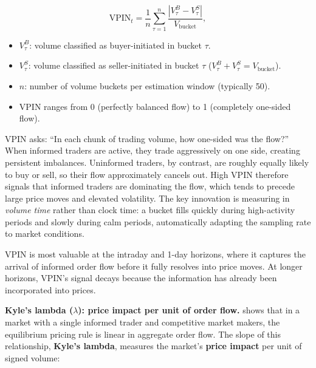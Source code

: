 \begin{equation}\label{eq:vpin}
\text{VPIN}_t = \frac{1}{n} \sum_{\tau=1}^{n} \frac{|V_\tau^B - V_\tau^S|}{V_{\text{bucket}}},
\end{equation}
\begin{itemize}[nosep]
  \item $V_\tau^B$: volume classified as buyer-initiated in bucket $\tau$.
  \item $V_\tau^S$: volume classified as seller-initiated in bucket $\tau$ ($V_\tau^B + V_\tau^S = V_{\text{bucket}}$).
  \item $n$: number of volume buckets per estimation window (typically 50).
  \item VPIN ranges from 0 (perfectly balanced flow) to 1 (completely one-sided flow).
\end{itemize}

\begin{intuition}
VPIN asks: ``In each chunk of trading volume, how one-sided was the flow?''
When informed traders are active, they trade aggressively on one side, creating persistent imbalances.
Uninformed traders, by contrast, are roughly equally likely to buy or sell, so their flow approximately cancels out.
High VPIN therefore signals that informed traders are dominating the flow, which tends to precede large price moves and elevated volatility.
The key innovation is measuring in \emph{volume time} rather than clock time: a bucket fills quickly during high-activity periods and slowly during calm periods, automatically adapting the sampling rate to market conditions.
\end{intuition}

\begin{projectconnection}
VPIN is most valuable at the intraday and 1-day horizons, where it captures the arrival of informed order flow before it fully resolves into price moves.
At longer horizons, VPIN's signal decays because the information has already been incorporated into prices.
\end{projectconnection}

\textbf{Kyle's lambda ($\lambda$): price impact per unit of order flow.}
\citet{Kyle1985} shows that in a market with a single informed trader and competitive market makers, the equilibrium pricing rule is linear in aggregate order flow.
The slope of this relationship, \textbf{Kyle's lambda}, measures the market's \textbf{price impact} per unit of signed volume:

